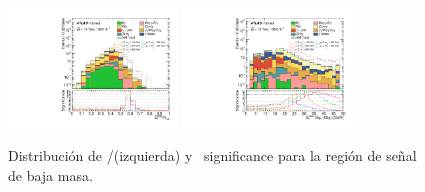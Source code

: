 \begin{figure}
\centering
  \includegraphics[width=0.4\textwidth]{images_tmp/can_SRd_200_met_etmeff_afterFit.pdf}%
  \includegraphics[width=0.4\textwidth]{images_tmp/can_SRd_200_met_sig_obj_afterFit.pdf}
  \caption{Distribución de \met/\meff (izquierda) y \met\ significance para la región de señal de baja masa.}
  \label{fig:metmeff_metsig_srd200}
\end{figure}